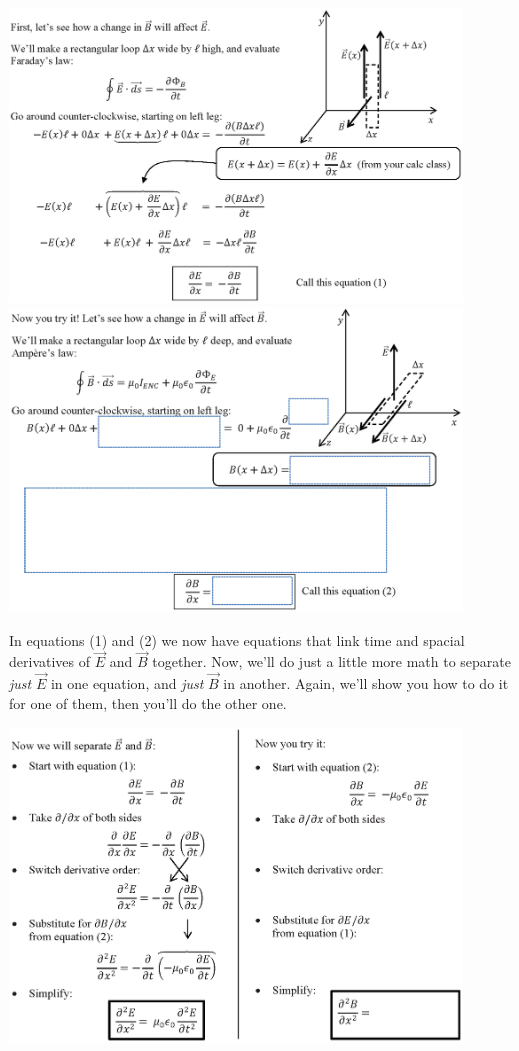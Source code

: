 \vspace{-0.1in}
\includegraphics[width=0.9\textwidth]{deriving_em_waves/change_in_B.eps} \newline
\underline{\hspace{\textwidth}}
\includegraphics[width=0.9\textwidth]{deriving_em_waves/change_in_E.eps}
\newpage

In equations (1) and (2) we now have equations that link time and spacial derivatives of $\vec E$ and $\vec B$ together.  Now, we'll do just a little more math to separate \textit{just} $\vec E$ in one equation, and \textit{just} $\vec B$ in another.  Again, we'll show you how to do it for one of them, then you'll do the other one.
\vspace{-0.2in}

\begin{center}
    \includegraphics[width=0.9\textwidth]{deriving_em_waves/separate_E_and_B.eps} 
 \end{center}
\vspace{-0.2in}

